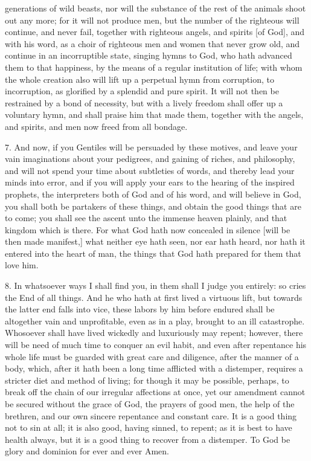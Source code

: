 generations of wild beasts, nor will the substance of the rest of the
animals shoot out any more; for it will not produce men, but the number of
the righteous will continue, and never fail, together with righteous
angels, and spirits [of God], and with his word, as a choir of righteous
men and women that never grow old, and continue in an incorruptible state,
singing hymns to God, who hath advanced them to that happiness, by the
means of a regular institution of life; with whom the whole creation also
will lift up a perpetual hymn from corruption, to incorruption, as
glorified by a splendid and pure spirit. It will not then be restrained by
a bond of necessity, but with a lively freedom shall offer up a voluntary
hymn, and shall praise him that made them, together with the angels, and
spirits, and men now freed from all bondage.

7. And now, if you Gentiles will be persuaded by these motives, and leave
your vain imaginations about your pedigrees, and gaining of riches, and
philosophy, and will not spend your time about subtleties of words, and
thereby lead your minds into error, and if you will apply your ears to the
hearing of the inspired prophets, the interpreters both of God and of his
word, and will believe in God, you shall both be partakers of these
things, and obtain the good things that are to come; you shall see the
ascent unto the immense heaven plainly, and that kingdom which is there.
For what God hath now concealed in silence [will be then made manifest,]
what neither eye hath seen, nor ear hath heard, nor hath it entered into
the heart of man, the things that God hath prepared for them that love
him.

8. In whatsoever ways I shall find you, in them shall I judge you
entirely: so cries the End of all things. And he who hath at first lived a
virtuous lift, but towards the latter end falls into vice, these labors by
him before endured shall be altogether vain and unprofitable, even as in a
play, brought to an ill catastrophe. Whosoever shall have lived wickedly
and luxuriously may repent; however, there will be need of much time to
conquer an evil habit, and even after repentance his whole life must be
guarded with great care and diligence, after the manner of a body, which,
after it hath been a long time afflicted with a distemper, requires a
stricter diet and method of living; for though it may be possible,
perhaps, to break off the chain of our irregular affections at once, yet
our amendment cannot be secured without the grace of God, the prayers of
good men, the help of the brethren, and our own sincere repentance and
constant care. It is a good thing not to sin at all; it is also good,
having sinned, to repent; as it is best to have health always, but it is a
good thing to recover from a distemper. To God be glory and dominion for
ever and ever Amen.
